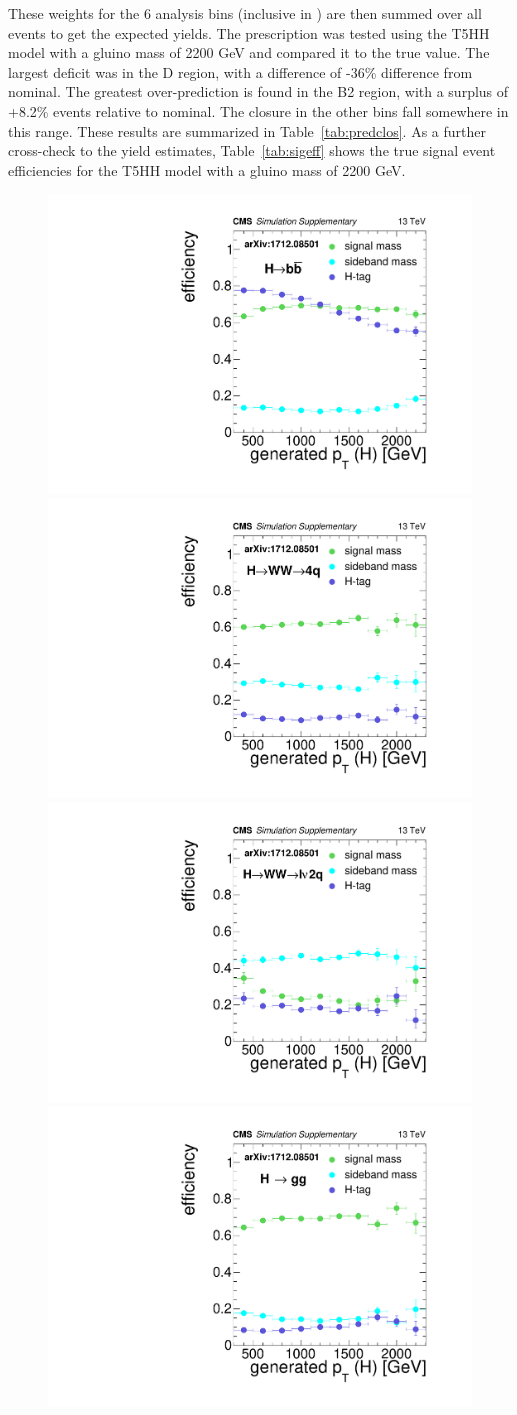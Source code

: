 These weights for the 6 analysis bins (inclusive in \ptmiss) are then summed over all events to get the expected yields.
The prescription was tested using the T5HH model with a gluino mass of 2200 GeV and compared it to the true value.
The largest deficit was in the D region, with a difference of -36\% difference from nominal.
The greatest over-prediction is found in the B2 region, with a surplus of +8.2\% events relative to nominal.
The closure in the other bins fall somewhere in this range.
These results are summarized in Table~\ref{tab:predclos}.
As a further cross-check to the yield estimates, Table~\ref{tab:sigeff} shows the true signal event efficiencies for the T5HH model with a gluino mass of 2200 GeV.

\begin{figure}[hbp!]
\centering
\includegraphics[width=0.425\linewidth]{figs/CMS-SUS-17-006_Figure-aux_006.pdf}
\includegraphics[width=0.425\linewidth]{figs/CMS-SUS-17-006_Figure-aux_007.pdf}
\includegraphics[width=0.425\linewidth]{figs/CMS-SUS-17-006_Figure-aux_008.pdf}
\includegraphics[width=0.425\linewidth]{figs/CMS-SUS-17-006_Figure-aux_009.pdf}

\end{figure}
